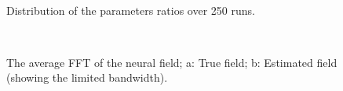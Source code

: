 \documentclass[12pt]{iopart}
\begin{document}
\begin{figure}[th]
\\
\caption{Distribution of the parameters ratios over 250 runs.}
\end{figure}
\label{fig:ParametersRatio}
\begin{figure}[th]
\centering
{}\label{fig:FieldFFT}
\label{fig:EstimatedFieldFFT}\\
\caption{The average FFT of the neural field; a: True field; b: Estimated field (showing the limited bandwidth).}
\label{fig:FFTTrueEstimate}
\end{figure}
\end{document}
